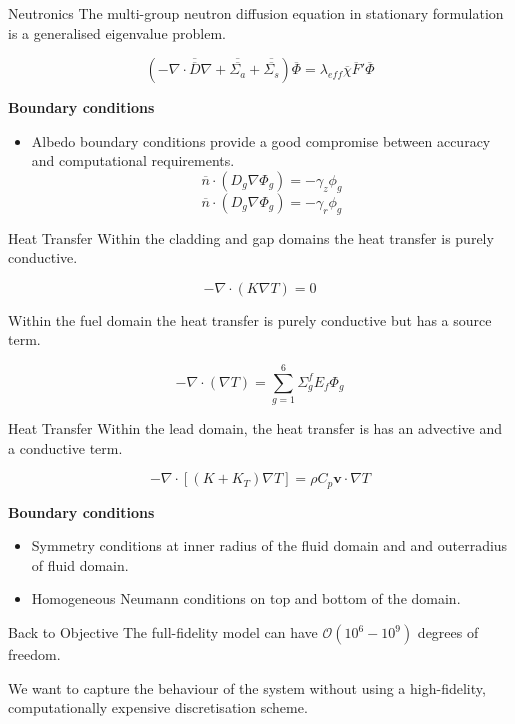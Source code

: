 \documentclass{beamer}
\renewcommand{\vec}[1]{\ensuremath{\overline{#1}}}
\newcommand{\mtx}[1]{\ensuremath{\overline{\overline{#1}}}}
\newcommand{\vect}[1]{\ensuremath{\boldsymbol{#1}}}
\begin{document}
\begin{frame}{Neutronics}
    The multi-group neutron diffusion equation in stationary formulation is a generalised eigenvalue problem. 
    \begin{block}{}
        \[\left ( - \nabla \cdot \mtx{D} \nabla + \mtx{\Sigma_a} + \mtx{\Sigma_s} \right ) \vec{\Phi} = \lambda_{eff} \vec{\chi} \vec{F}' \vec{\Phi}\]
    \end{block}
    \bigskip
    \textbf{Boundary conditions}
    \begin{itemize}
        \item Albedo boundary conditions provide a good compromise between accuracy and computational requirements.
        \[\vec{n}\cdot(D_g\nabla \Phi_g) = - \gamma_z \phi_g\]
        \[\vec{n}\cdot(D_g\nabla \Phi_g) = - \gamma_r \phi_g\]
    \end{itemize}
\end{frame}

\begin{frame}{Heat Transfer}
    Within the cladding and gap domains the heat transfer is purely conductive. 
    \begin{block}{}
        \[-\nabla \cdot (K \nabla T) = 0\]
    \end{block}
    \bigskip
    Within the fuel domain the heat transfer is purely conductive but has a source term.
    \begin{block}{}
        \[-\nabla \cdot ( \nabla T) = \sum_{g=1}^{6}\Sigma_{g}^{f} E_f \Phi_g\]
    \end{block}
\end{frame}

\begin{frame}{Heat Transfer}
    Within the lead domain, the heat transfer is has an advective and a conductive term. 
    \begin{block}{}
        \[-\nabla \cdot \left [(K + K_T) \nabla T \right ]= \rho C_p \vect{v} \cdot \nabla T\]
    \end{block}
    \bigskip
    \textbf{Boundary conditions}
    \begin{itemize}
        \item Symmetry conditions at inner  radius of the fluid  domain and and outerradius of fluid domain.
        \item Homogeneous Neumann conditions on top and bottom of the domain.
    \end{itemize}
\end{frame}

\begin{frame}{Back to Objective}
    The full-fidelity model can have $\mathcal{O}(10^6 - 10^9)$ degrees of freedom.
    
    \bigskip
    We want to capture the behaviour of the system without using a high-fidelity, computationally expensive discretisation scheme.
\end{frame}
\end{document}

